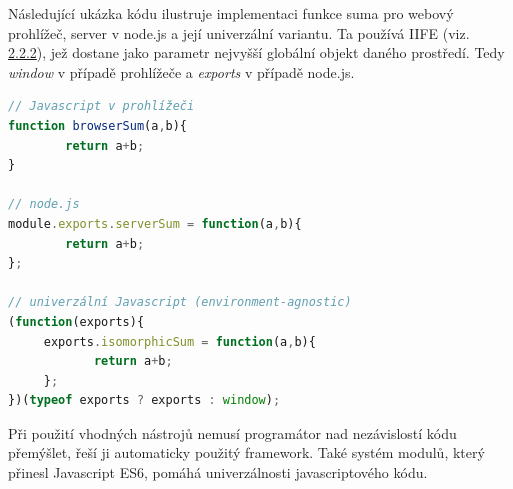 \vspace{3mm}
\noindent Následující ukázka kódu ilustruje implementaci funkce suma pro webový prohlížeč, server v node.js a její univerzální variantu. Ta používá IIFE (viz. \hyperref[sec:variable_scope]{2.2.2}), jež dostane jako parametr nejvyšší globální objekt daného prostředí. Tedy \textit{window} v případě prohlížeče a \textit{exports} v případě node.js.
\begin{lstlisting}[language=Javascript,caption={Ukázka principu enviroment-agnostic, tedy JS kódu nezávislého na běhovém prostředí}]
// Javascript v prohlížeči
function browserSum(a,b){
		return a+b;
}

// node.js
module.exports.serverSum = function(a,b){
		return a+b;
};

// univerzální Javascript (environment-agnostic)
(function(exports){
     exports.isomorphicSum = function(a,b){
     		return a+b;
     };
})(typeof exports ? exports : window);
\end{lstlisting}

Při použití vhodných nástrojů nemusí programátor nad nezávislostí kódu přemýšlet, řeší ji automaticky použitý framework. Také systém modulů, který přinesl Javascript ES6, pomáhá univerzálnosti javascriptového kódu.


